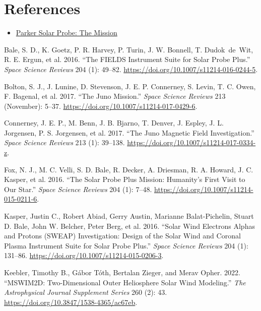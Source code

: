 \documentclass[
  letterpaper,
  DIV=11,
  numbers=noendperiod,
  oneside]{scrartcl}
\providecommand{\tightlist}{%
  \setlength{\itemsep}{0pt}\setlength{\parskip}{0pt}}\usepackage{longtable,booktabs,array}
\newlength{\cslhangindent}
\newenvironment{CSLReferences}[2] %
 {\begin{list}{}{%
  \setlength{\itemindent}{0pt}
  \setlength{\leftmargin}{0pt}
  \setlength{\parsep}{0pt}
  \ifodd #1
   \setlength{\leftmargin}{\cslhangindent}
   \setlength{\itemindent}{-1\cslhangindent}
  \fi
  \setlength{\itemsep}{#2\baselineskip}}}
 {\end{list}}
\begin{document}
\section{References}\label{references}

\begin{itemize}
\tightlist
\item
  \href{https://parkersolarprobe.jhuapl.edu/The-Mission/index.php}{Parker
  Solar Probe: The Mission}
\end{itemize}

\label{refs}
\begin{CSLReferences}{1}{0}
Bale, S. D., K. Goetz, P. R. Harvey, P. Turin, J. W. Bonnell, T.
Dudok~de~Wit, R. E. Ergun, et al. 2016. {``The FIELDS Instrument Suite
for Solar Probe Plus.''} \emph{Space Science Reviews} 204 (1): 49--82.
\url{https://doi.org/10.1007/s11214-016-0244-5}.

Bolton, S. J., J. Lunine, D. Stevenson, J. E. P. Connerney, S. Levin, T.
C. Owen, F. Bagenal, et al. 2017. {``The Juno Mission.''} \emph{Space
Science Reviews} 213 (November): 5--37.
\url{https://doi.org/10.1007/s11214-017-0429-6}.

Connerney, J. E. P., M. Benn, J. B. Bjarno, T. Denver, J. Espley, J. L.
Jorgensen, P. S. Jorgensen, et al. 2017. {``The Juno Magnetic Field
Investigation.''} \emph{Space Science Reviews} 213 (1): 39--138.
\url{https://doi.org/10.1007/s11214-017-0334-z}.

Fox, N. J., M. C. Velli, S. D. Bale, R. Decker, A. Driesman, R. A.
Howard, J. C. Kasper, et al. 2016. {``The Solar Probe Plus Mission:
Humanity{'}s First Visit to Our Star.''} \emph{Space Science Reviews}
204 (1): 7--48. \url{https://doi.org/10.1007/s11214-015-0211-6}.

Kasper, Justin C., Robert Abiad, Gerry Austin, Marianne Balat-Pichelin,
Stuart D. Bale, John W. Belcher, Peter Berg, et al. 2016. {``Solar Wind
Electrons Alphas and Protons (SWEAP) Investigation: Design of the Solar
Wind and Coronal Plasma Instrument Suite for Solar Probe Plus.''}
\emph{Space Science Reviews} 204 (1): 131--86.
\url{https://doi.org/10.1007/s11214-015-0206-3}.

Keebler, Timothy B., Gábor Tóth, Bertalan Zieger, and Merav Opher. 2022.
{``MSWIM2D: Two-Dimensional Outer Heliosphere Solar Wind Modeling.''}
\emph{The Astrophysical Journal Supplement Series} 260 (2): 43.
\url{https://doi.org/10.3847/1538-4365/ac67eb}.


\end{CSLReferences}
\end{document}
